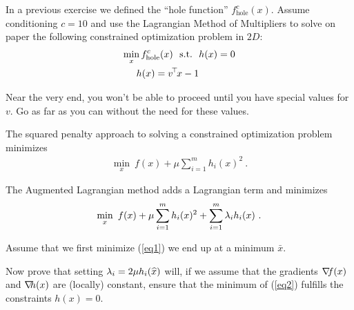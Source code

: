 

\renewcommand{\course}{Maths for Intelligent Systems}
\renewcommand{\coursedate}{Summer 2019}

\renewcommand{\exnum}{Exercise 7}

\exercises

\exercisestitle



In a previous exercise we defined the ``hole function'' $f^c_{\text{hole}}(x)$. Assume conditioning $c=10$ and use the Lagrangian Method of Multipliers to
solve on paper the following constrained optimization problem in $2D$:
\begin{align}
\min_x f^c_{\text{hole}}(x) ~~\text{s.t.}~~& h(x)=0 \\
h(x) = v^{\!\top\!} x - 1
\end{align}

Near the very end, you won't be able to proceed until you have special values
for $v$. Go as far as you can without the need for these values.




The squared penalty approach to solving a constrained optimization problem minimizes
\begin{align}
\min_x~ f(x) + \mu \sum_{i=1}^m h_i(x)^2 ~. \label{eq1}
\end{align}

The Augmented Lagrangian method adds a Lagrangian term and minimizes
\begin{align}
\min_x~ f(x) + \mu \sum_{i=1}^m h_i(x)^2 + \sum_{i=1}^m \lambda_i h_i(x)
~.\label{eq2}
\end{align}

Assume that we first minimize (\ref{eq1}) we end up at a minimum $\bar{x}$.

Now prove that setting $\lambda_i = 2\mu h_i(\widehat{x})$ will, if we assume
that the gradients ${\nabla_{\!\!}} f(x)$ and ${\nabla_{\!\!}} h(x)$ are (locally) constant,
ensure that the minimum of (\ref{eq2}) fulfills the constraints
$h(x)=0$.





\exerfoot
